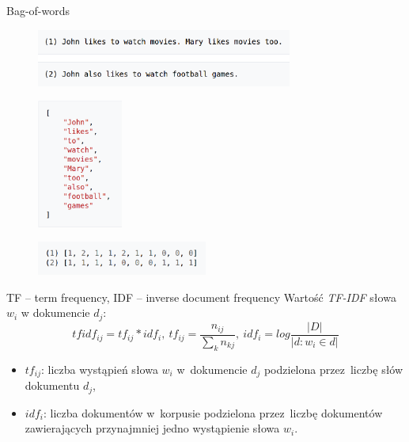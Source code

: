 \documentclass{beamer}
\begin{document}
	\begin{frame}{Bag-of-words}
		\begin{figure}
			\centering
			\includegraphics[width=0.75\textwidth]{img/bow_sents.png}
		\end{figure}
		\begin{figure}
			\centering
			\includegraphics[width=0.25\textwidth]{img/bow_dict.png}
		\end{figure}
		\begin{figure}
			\centering
			\includegraphics[width=0.5\textwidth]{img/bow_repr.png}
		\end{figure}
	\end{frame}
	\begin{frame}{TF – term frequency, IDF – inverse document frequency}
		Wartość \textit{TF-IDF} słowa $w_i$ w dokumencie $d_j$:
		\begin{equation}
		\label{eq:tf-idf}
		tfidf_{ij} = tf_{ij} * idf_i,\ tf_{ij} = \frac{n_{ij}}{\sum\limits_{k}n_{kj}},\ idf_i = log\frac{|D|}{|{d:w_i \in d}|}
		\end{equation}
		\begin{itemize}
			\item $tf_{ij}$: liczba wystąpień słowa $w_i$ w~dokumencie $d_j$ podzielona przez~liczbę słów dokumentu $d_j$,
			\item $idf_i$: liczba dokumentów w~korpusie podzielona przez~liczbę dokumentów zawierających przynajmniej jedno wystąpienie słowa $w_i$.
		\end{itemize}
	\end{frame}
\end{document}
